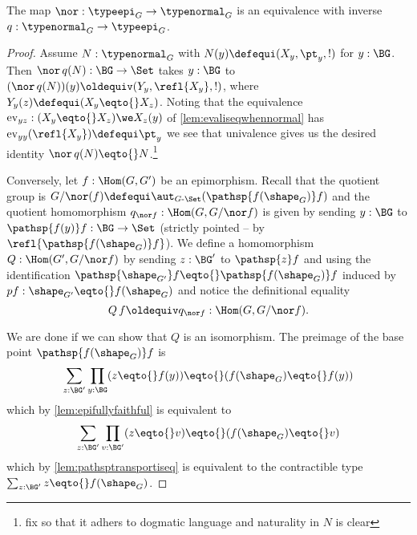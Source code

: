 \begin{lemma}
  \label{lem:qeq}
  The map $\nor:\typeepi_G\to\typenormal_G$ is an equivalence with inverse $q:\typenormal_G\to\typeepi_G$.
\end{lemma}
\begin{proof}
  Assume $N:\typenormal_G$ with $N(y)\defequi(X_y,\pt_y,!)$ for $y:\BG$.
  Then $\nor\, q(N):\BG\to\Set$ takes $y:\BG$ to $(\nor\, q(N))(y)\oldequiv(Y_y,\refl{X_y},!)$, where $Y_y(z)\defequi (X_y\eqto{}X_z)$.
  Noting that the equivalence $\mathrm{ev}_{yz}:(X_y\eqto{}X_z)\we X_z(y)$ of \cref{lem:evaliseqwhennormal} has $\mathrm{ev}_{yy}(\refl{X_y})\defequi \pt_y$ we see that univalence gives us the desired identity $\nor\, q(N)\eqto{}N$.\footnote{fix so that it adhers to dogmatic language and naturality in $N$ is clear}

  Conversely, let $f:\Hom(G,G')$ be an epimorphism.
  Recall that the quotient group is $G/\nor(f)\defequi\aut_{G\text{-}\Set}(\pathsp{f(\shape_G)}f)$ and the quotient homomorphism $q_{\nor f}:\Hom(G,G/\nor f)$ is given by sending $y:\BG$ to $\pathsp{f(y)}f:\BG\to\Set$ (strictly pointed -- \ie by $\refl{\pathsp{f(\shape_G)}f}$).
  We define a homomorphism $Q:\Hom(G',G/\nor f)$ by sending $z:\BG'$ to $\pathsp{z}f$ and using the identification $\pathsp{\shape_{G'}}f\eqto{}\pathsp{f(\shape_G)}f$ induced by $pf:\shape_{G'}\eqto{}f(\shape_G)$ and notice the definitional equality
  $$Q\,f\oldequiv q_{\nor f}:\Hom(G,G/\nor f).$$

We are done if we can show that $Q$ is an isomorphism.
The preimage of the base point $\pathsp{f(\shape_G)}f$ is
$$\sum_{z:\BG'}\prod_{y:\BG}(z\eqto{}f(y))\eqto{}(f(\shape_G)\eqto{}f(y))$$
which by
\cref{lem:epifullyfaithful} is equivalent to
$$\sum_{z:\BG'}\prod_{v:\BG'}(z\eqto{}v)\eqto{}(f(\shape_G)\eqto{}v)$$
which by \cref{lem:pathsptransportiseq} is equivalent to the contractible type $\sum_{z:\BG'}z\eqto{}f(\shape_G)$.
\end{proof}

